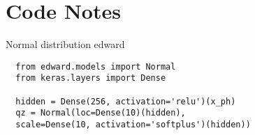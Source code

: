 \documentclass[letterpaper]{article}
\begin{document}
  \newpage
  \section{Code Notes}
  Normal distribution edward

  \begin{verbatim}
  from edward.models import Normal
  from keras.layers import Dense
  
  hidden = Dense(256, activation='relu')(x_ph)
  qz = Normal(loc=Dense(10)(hidden),
  scale=Dense(10, activation='softplus')(hidden))
  \end{verbatim}
  
  \newpage
  
  
 
  
  
  
\end{document}
